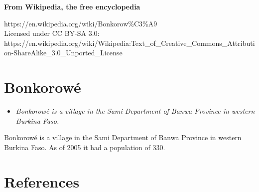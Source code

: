 \textbf{From Wikipedia, the free encyclopedia}

https://en.wikipedia.org/wiki/Bonkorow\%C3\%A9\\
Licensed under CC BY-SA 3.0:\\
https://en.wikipedia.org/wiki/Wikipedia:Text\_of\_Creative\_Commons\_Attribution-ShareAlike\_3.0\_Unported\_License

\section{Bonkorowé}\label{bonkorowuxe9}

\begin{itemize}
\item
  \emph{Bonkorowé is a village in the Sami Department of Banwa Province
  in western Burkina Faso.}
\end{itemize}

Bonkorowé is a village in the Sami Department of Banwa Province in
western Burkina Faso. As of 2005 it had a population of 330.

\section{References}\label{references}
